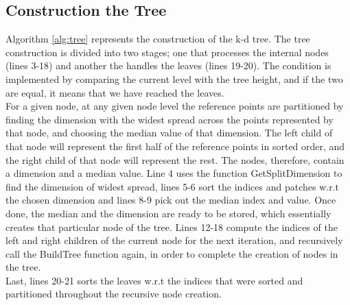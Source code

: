 \subsection{Construction the Tree}

Algorithm \ref{alg:tree} represents the construction of the k-d tree. The tree construction is divided into two stages; one that processes the internal nodes (lines 3-18) and another the handles the leaves (lines 19-20). 
The condition is implemented by comparing the current level with the tree height, and if the two are equal, it means that we have reached the leaves. 
\\[2mm]
For a given node, at any given node level the reference points are partitioned by finding the dimension with the widest spread across the points represented by that node, and choosing the median value of that dimension. The left child of that node will represent the first half of the reference points in sorted order, and the right child of that node will represent the rest. 
The nodes, therefore, contain a dimension and a median value. Line 4 uses the function GetSplitDimension to find the dimension of widest spread, lines 5-6 sort the indices and patches w.r.t the chosen dimension and lines 8-9 pick out the median index and value. Once done, the median and the dimension are ready to be stored, which essentially creates that particular node of the tree. Lines 12-18 compute the indices of the left and right children of the current node for the next iteration, and recursively call the BuildTree function again, in order to complete the creation of nodes in the tree. 
\\[2mm]
Last, lines 20-21 sorts the leaves w.r.t the indices that were sorted and partitioned throughout the recursive node creation.


